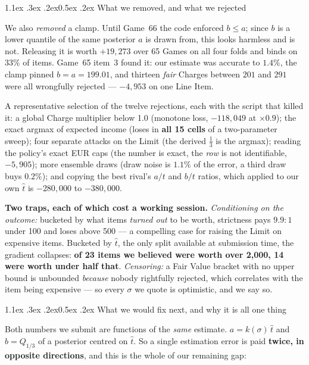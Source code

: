 \documentclass[9pt,a4paper,twocolumn]{article}
\makeatletter
\renewcommand\section{\@startsection{section}{1}{\z@}%
  {1.1ex \@plus .3ex \@minus .2ex}{0.5ex \@plus .2ex}%
  {\normalfont\normalsize\bfseries}}
\newcommand{\charge}{a}
\newcommand{\limitv}{b}
\newcommand{\fair}{t}
\newcommand{\est}{\hat{t}}
\makeatother
\begin{document}
\section{What we removed, and what we rejected}

We also \emph{removed} a clamp. Until Game~66 the code enforced $\limitv\le\charge$; since
$\limitv$ is a lower quantile of the same posterior $\charge$ is drawn from, this looks harmless
and is not. Releasing it is worth $+19{,}273$ over 65 Games on all four folds and binds on $33\%$
of items. Game~65 item~3 found it: our estimate was accurate to $1.4\%$, the clamp pinned
$\limitv=\charge=199.01$, and thirteen \emph{fair} Charges between $201$ and $291$ were all
wrongfully rejected --- $-4{,}953$ on one Line Item.

A representative selection of the twelve rejections, each with the script that killed it: a global
Charge multiplier below 1.0 (monotone loss, $-118{,}049$ at $\times0.9$); the exact argmax of
expected income (loses in \textbf{all 15 cells} of a two-parameter sweep); four separate attacks on
the Limit (the derived $\frac13$ is the argmax); reading the policy's exact EUR caps (the number is
exact, the \emph{row} is not identifiable, $-5{,}905$); more ensemble draws (draw noise is
$1.1\%$ of the error, a third draw buys $0.2\%$); and copying the best rival's $\charge/\fair$ and
$\limitv/\fair$ ratios, which applied to our own $\est$ is $-280{,}000$ to $-380{,}000$.

\textbf{Two traps, each of which cost a working session.} \emph{Conditioning on the outcome:}
bucketed by what items \emph{turned out} to be worth, strictness pays $9.9{:}1$ under 100 and loses
above 500 --- a compelling case for raising the Limit on expensive items. Bucketed by $\est$, the
only split available at submission time, the gradient collapses: \textbf{of 23 items we believed
were worth over 2{,}000, 14 were worth under half that}. \emph{Censoring:} a Fair Value bracket
with no upper bound is unbounded \emph{because} nobody rightfully rejected, which correlates with
the item being expensive --- so every $\sigma$ we quote is optimistic, and we say so.

\section{What we would fix next, and why it is all one thing}

Both numbers we submit are functions of the \emph{same} estimate. $\charge=k(\sigma)\,\est$ and
$\limitv=Q_{1/3}$ of a posterior centred on $\est$. So a single estimation error is paid
\textbf{twice, in opposite directions}, and this is the whole of our remaining gap:
\end{document}
